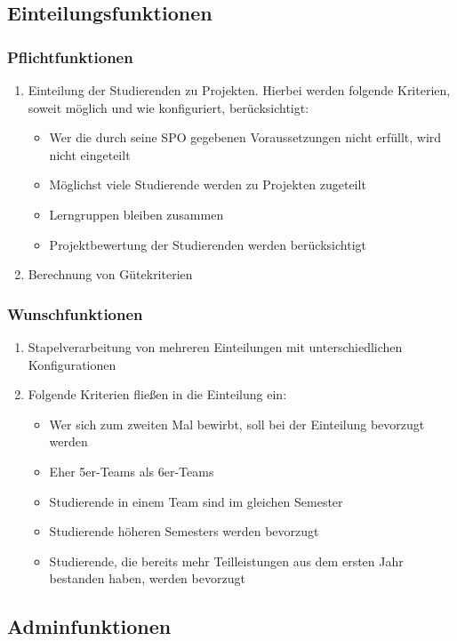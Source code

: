 \documentclass[parskip=full]{scrartcl}
\newcommand{\swtLabel}[1]{\textbf{/#1\arabic*0/}}
\begin{document}
\subsection{Einteilungsfunktionen}
\subsubsection{Pflichtfunktionen}
\begin{enumerate}[label=\swtLabel{FA}]
  \item Einteilung der Studierenden zu Projekten. Hierbei werden folgende
  Kriterien, soweit möglich und wie konfiguriert, berücksichtigt:
\begin{itemize}
  \item Wer die durch seine SPO gegebenen Voraussetzungen nicht erfüllt, wird nicht
eingeteilt
\item Möglichst viele Studierende werden zu Projekten zugeteilt
\item Lerngruppen bleiben zusammen
\item Projektbewertung der Studierenden werden berücksichtigt
\end{itemize}
\item Berechnung von Gütekriterien
\end{enumerate}
\subsubsection{Wunschfunktionen}
\begin{enumerate}[label=\swtLabel{FA}, resume]
  \item Stapelverarbeitung von mehreren Einteilungen mit unterschiedlichen Konfigurationen
\item Folgende Kriterien fließen in die Einteilung ein:
\begin{itemize}
  \item Wer sich zum zweiten Mal bewirbt, soll bei der Einteilung bevorzugt
  werden
  \item Eher 5er-Teams als 6er-Teams
  \item Studierende in einem Team sind im gleichen Semester
  \item Studierende höheren Semesters werden bevorzugt
  \item Studierende, die bereits mehr Teilleistungen aus dem ersten Jahr bestanden
haben, werden bevorzugt
\end{itemize}
\end{enumerate}
\subsection{Adminfunktionen}
\end{document}
